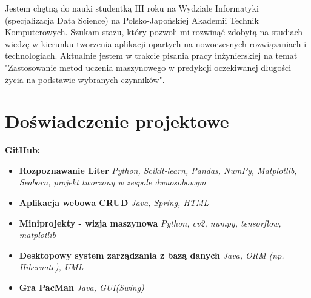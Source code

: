 \documentclass[12pt,a4paper]{article}
\begin{document}
\vspace{-0.1cm}
\begin{minipage}[t]{0.54\textwidth} %
    \color{textdark}
    \small
    Jestem chętną do nauki studentką III roku na Wydziale Informatyki (specjalizacja Data Science) na Polsko-Japońskiej Akademii Technik Komputerowych. Szukam stażu, który pozwoli mi rozwinąć zdobytą na studiach wiedzę w kierunku tworzenia aplikacji opartych na nowoczesnych rozwiązaniach i technologiach. Aktualnie jestem w trakcie pisania pracy inżynierskiej na temat "Zastosowanie metod uczenia maszynowego w predykcji oczekiwanej długości życia na podstawie wybranych czynników".
    
    \section*{Doświadczenie projektowe}
    \textbf{GitHub:} \href{https://github.com/s31302}{\color{headerblue}{github.com/s31302}}
    
    \begin{itemize}[leftmargin=*, noitemsep, topsep=2pt]

        \item\textbf{Rozpoznawanie Liter}
        \textit{Python, Scikit-learn, Pandas, NumPy, Matplotlib, Seaborn, projekt tworzony w zespole dwuosobowym} 
        \href{https://github.com/s31302/rozpoznawanie_liter}{\footnotesize\color{headerblue}{[Kod źródłowy]}}

        \item\textbf{Aplikacja webowa CRUD} \textit{Java, Spring, HTML} 
        \href{https://github.com/s31302/spring-boot-anime-crud}{\footnotesize\color{headerblue}{[Kod źródłowy]}}

        \item\textbf{Miniprojekty -  wizja maszynowa} \textit{Python, cv2, numpy, tensorflow, matplotlib} 
        \href{https://github.com/s31302/wma}{\footnotesize\color{headerblue}{[Kod źródłowy]}}

        \item\textbf{Desktopowy system zarządzania z bazą danych} \textit{Java, ORM (np. Hibernate), UML}
        {\footnotesize\color{textdark}{[Projekt akademicki -- kod prywatny ze względu na restrykcje antyplagiatowe]}}
        
        \item\textbf{Gra PacMan} \textit{Java, GUI(Swing)}
        \href{https://github.com/s31302/pac-man}{\footnotesize\color{headerblue}{[Kod źródłowy]}}


\end{itemize}
\end{minipage}
\end{document}
